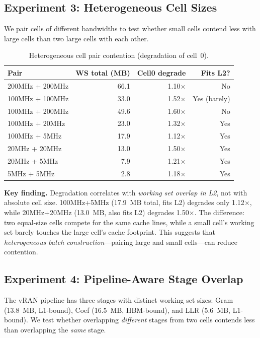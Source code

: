 \subsection{Experiment 3: Heterogeneous Cell Sizes}
\label{sec:exp3}

We pair cells of different bandwidths to test whether small cells contend less with large cells than two large cells with each other.

\begin{table}[h]
\centering
\small
\caption{Heterogeneous cell pair contention (degradation of cell~0).}
\label{tab:hetero}
\begin{tabular}{@{}lrrr@{}}
\toprule
Pair & WS total (MB) & Cell0 degrade & Fits L2? \\
\midrule
200MHz + 200MHz & 66.1 & 1.10$\times$ & No \\
100MHz + 100MHz & 33.0 & 1.52$\times$ & Yes (barely) \\
100MHz + 200MHz & 49.6 & 1.60$\times$ & No \\
100MHz + 20MHz & 23.0 & 1.32$\times$ & Yes \\
100MHz + 5MHz & 17.9 & 1.12$\times$ & Yes \\
20MHz + 20MHz & 13.0 & 1.50$\times$ & Yes \\
20MHz + 5MHz & 7.9 & 1.21$\times$ & Yes \\
5MHz + 5MHz & 2.8 & 1.18$\times$ & Yes \\
\bottomrule
\end{tabular}
\end{table}

\textbf{Key finding.} Degradation correlates with \emph{working set overlap in L2}, not with absolute cell size. 100MHz+5MHz (17.9~MB total, fits L2) degrades only 1.12$\times$, while 20MHz+20MHz (13.0~MB, also fits L2) degrades 1.50$\times$. The difference: two equal-size cells compete for the same cache lines, while a small cell's working set barely touches the large cell's cache footprint. This suggests that \emph{heterogeneous batch construction}---pairing large and small cells---can reduce contention.

\subsection{Experiment 4: Pipeline-Aware Stage Overlap}
\label{sec:exp4}

The vRAN pipeline has three stages with distinct working set sizes: Gram (13.8~MB, L1-bound), Coef (16.5~MB, HBM-bound), and LLR (5.6~MB, L1-bound). We test whether overlapping \emph{different} stages from two cells contends less than overlapping the \emph{same} stage.

